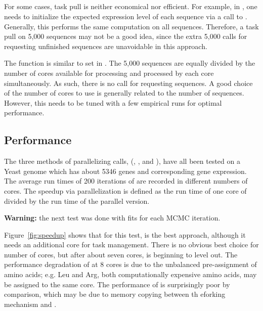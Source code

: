 \subsection[pbdLapply()]{}
\label{sec:pbdLapply}

For some cases, task pull is neither economical nor efficient. For example, in
, one needs to initialize the expected expression level of each 
sequence via a call to . Generally, this performs the 
same computation on all sequences. Therefore, a task pull on 5,000
sequences may not be a good idea, since the extra 5,000 calls for requesting 
unfinished sequences are unavoidable in this approach.

The function  is similar to set 
in . The 5,000 sequences are equally divided by the number of 
cores available for processing and processed by each core simultaneously. 
As such, there is no call for requesting sequences. A good 
choice of the number of cores to use is generally related to the number of 
sequences. However, this needs to be tuned with a few empirical runs for 
optimal performance.


\subsection[Performance]{Performance}
\label{sec:performance}

The three methods of parallelizing  calls,  
(, , and
), have all been tested on a Yeast genome which has about 
5346 genes and corresponding gene expression. The average run times of 200 
iterations of  are recorded in different numbers of cores. 
The speedup via parallelization is defined as the run time of one core of 
 divided by the run time of the parallel version.

{\color{red} \bf Warning:} the next test was done with 
fits for each MCMC iteration.

Figure~\ref{fig:speedup} shows that for this test,  is the 
best approach, although it needs an additional core for task management. 
There is no obvious best choice for number of cores, but after about seven 
cores,  is beginning to level out.  The 
performance degradation of  at 8 cores is due to the 
unbalanced pre-assignment of amino acids; e.g. Leu and Arg, both 
computationally expensive amino acids, may be assigned to the same core.
The performance of  is surprisingly poor by comparison, which 
may be due to memory copying between th eforking mechanism and 
. 


